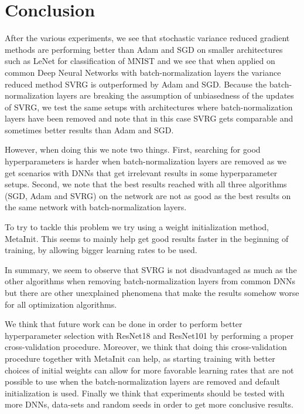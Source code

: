 \documentclass[a4paper,11pt,oneside]{report}
\begin{document}
\chapter{Conclusion}

After the various experiments, we see that stochastic variance reduced gradient methods are performing better than Adam and SGD on smaller architectures such as LeNet for classification of MNIST and we see that when applied on common Deep Neural Networks with batch-normalization layers the variance reduced method SVRG is outperformed by Adam and SGD.
Because the batch-normalization layers are breaking the assumption of unbiasedness of the updates of SVRG, we test the same setups with architectures where batch-normalization layers have been removed and note that in this case SVRG gets comparable and sometimes better results than Adam and SGD. 

However, when doing this we note two things. First, searching for good hyperparameters is harder when batch-normalization layers are removed as we get scenarios with DNNs that get irrelevant results in some hyperparameter setups. 
Second, we note that the best results reached with all three algorithms (SGD, Adam and SVRG) on the network are not as good as the best results on the same network with batch-normalization layers.

To try to tackle this problem we try using a weight initialization method, MetaInit. This seems to mainly help get good results faster in the beginning of training, by allowing bigger learning rates to be used. 

In summary, we seem to observe that SVRG is not disadvantaged as much as the other algorithms when removing batch-normalization layers from common DNNs but there are other unexplained phenomena that make the results somehow worse for all optimization algorithms.

We think that future work can be done in order to perform better hyperparameter selection with ResNet18 and ResNet101 by performing a proper cross-validation procedure. 
Moreover, we think that doing this cross-validation procedure together with MetaInit can help, as starting training with better choices of initial weights can allow for more favorable learning rates that are not possible to use when the batch-normalization layers are removed and default initialization is used. Finally we think that experiments should be tested with more DNNs, data-sets and random seeds in order to get more conclusive results. 

\makeacks


\cleardoublepage
{}
{}


\end{document}
